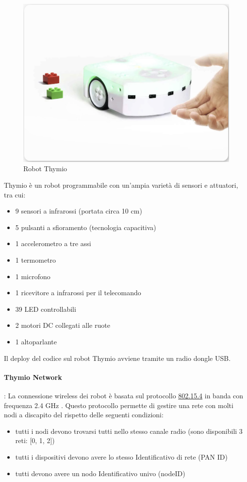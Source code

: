 \documentclass[12pt,a4paper,openright,twoside]{book}
\begin{document}
\begin{figure}
    \centering
    \includegraphics[width=.7\linewidth]{figures/thymio.png}
    \caption{Robot Thymio}
    \label{fig:thymio-robot}
\end{figure}

Thymio \cite{mobsyaThymioDevice} è un robot programmabile con un'ampia varietà di sensori e attuatori, tra cui:
\begin{itemize}
    \item 9 sensori a infrarossi (portata circa 10 cm)
    \item 5 pulsanti a sfioramento (tecnologia capacitiva)
    \item 1 accelerometro a tre assi
    \item 1 termometro
    \item 1 microfono
    \item 1 ricevitore a infrarossi per il telecomando
    \item 39 LED controllabili
    \item 2 motori DC collegati alle ruote
    \item 1 altoparlante
\end{itemize}

Il deploy del codice sul robot Thymio avviene tramite un radio dongle USB.
\paragraph{Thymio Network}: La connessione wireless dei robot è basata sul protocollo \href{https://en.wikipedia.org/wiki/IEEE_802.15.4}{802.15.4} in banda con frequenza 2.4 GHz \cite{wikidotSettingWireless}. Questo protocollo permette di gestire una rete con molti nodi a discapito del rispetto delle seguenti condizioni:

\begin{itemize}
    \item tutti i nodi devono trovarsi tutti nello stesso canale radio (sono disponibili 3 reti: [0, 1, 2])
    \item tutti i dispositivi devono avere lo stesso Identificativo di rete (PAN ID)
    \item tutti devono avere un nodo Identificativo univo (nodeID)
\end{itemize}
\end{document}
